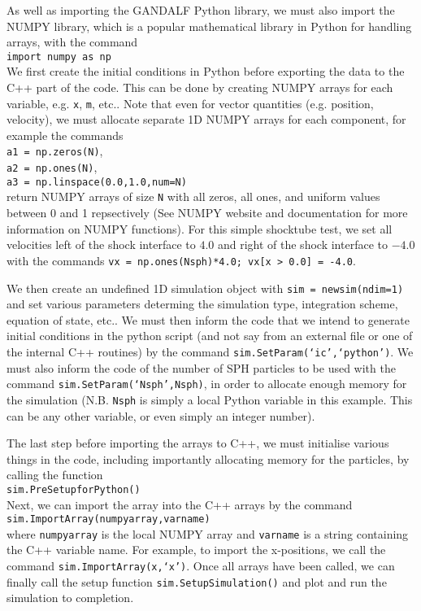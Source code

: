 \documentclass[a4paper]{article}
\newcommand{\var}[1]{\texttt{#1}}
\newcommand{\singlecommand}[1]{\\ \newline \indent \var{#1} \\ \newline \noindent}
\begin{document}
\noindent As well as importing the GANDALF Python library, we must also import the NUMPY library, which is a popular mathematical library in Python for handling arrays, with the command \singlecommand{import numpy as np}
We first create the initial conditions in Python before exporting the data to the C++ part of the code.  This can be done by creating NUMPY arrays for each variable, e.g. \var{x}, \var{m}, etc..  Note that even for vector quantities (e.g. position, velocity), we must allocate separate 1D NUMPY arrays for each component, for example the commands \\
\newline
\indent \var{a1 = np.zeros(N)}, \\
\indent \var{a2 = np.ones(N)}, \\
\indent \var{a3 = np.linspace(0.0,1.0,num=N)} \\
\newline
return NUMPY arrays of size \var{N} with all zeros, all ones, and uniform values between 0 and 1 repsectively  (See NUMPY website and documentation for more information on NUMPY functions).  For this simple shocktube test, we set all velocities left of the shock interface to $4.0$ and right of the shock interface to $-4.0$ with the commands \var{vx = np.ones(Nsph)*4.0; vx[x > 0.0] = -4.0}.

We then create an undefined 1D simulation object with \var{sim = newsim(ndim=1)} and set various parameters determing the simulation type, integration scheme, equation of state, etc..  We must then inform the code that we intend to generate initial conditions in the python script (and not say from an external file or one of the internal C++ routines) by the command \var{sim.SetParam(`ic',`python')}.  We must also inform the code of the number of SPH particles to be used with the command \var{sim.SetParam(`Nsph',Nsph)}, in order to allocate enough memory for the simulation (N.B. \var{Nsph} is simply a local Python variable in this example.  This can be any other variable, or even simply an integer number).

The last step before importing the arrays to C++, we must initialise various things in the code, including importantly allocating memory for the particles, by calling the function \singlecommand{sim.PreSetupforPython()}
Next, we can import the array into the C++ arrays by the command \singlecommand{sim.ImportArray(numpyarray,varname)}
where \var{numpyarray} is the local NUMPY array and \var{varname} is a string containing the C++ variable name.  For example, to import the x-positions, we call the command \var{sim.ImportArray(x,`x')}.  Once all arrays have been called, we can finally call the setup function \var{sim.SetupSimulation()} and plot and run the simulation to completion.
\end{document}
